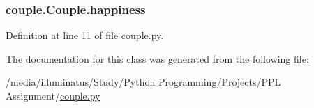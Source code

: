 \subsubsection[{\texorpdfstring{happiness}{happiness}}]{\setlength{\rightskip}{0pt plus 5cm}couple.\+Couple.\+happiness}\hypertarget{classcouple_1_1_couple_acfd8db3febb395596db4f5ab4ed53976}{}\label{classcouple_1_1_couple_acfd8db3febb395596db4f5ab4ed53976}


Definition at line 11 of file couple.\+py.



The documentation for this class was generated from the following file\+:\begin{DoxyCompactItemize}
\item 
/media/illuminatus/\+Study/\+Python Programming/\+Projects/\+P\+P\+L Assignment/\hyperlink{couple_8py}{couple.\+py}\end{DoxyCompactItemize}
